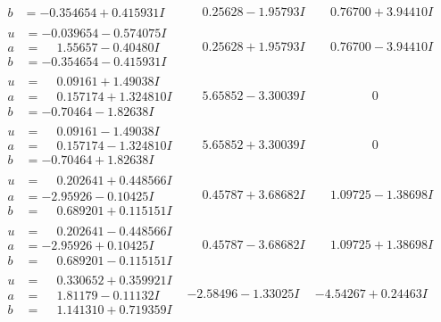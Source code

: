 \documentclass[1p]{elsarticle_modified}
\theoremstyle{definition}
\begin{document}
$$\begin{array}{c|c|c}
\begin{aligned}
b &= -0.354654 + 0.415931 I\end{aligned}
 & \phantom{-}0.25628 - 1.95793 I & \phantom{-}0.76700 + 3.94410 I \\ \hline\begin{aligned}
u &= -0.039654 - 0.574075 I \\
a &= \phantom{-}1.55657 - 0.40480 I \\
b &= -0.354654 - 0.415931 I\end{aligned}
 & \phantom{-}0.25628 + 1.95793 I & \phantom{-}0.76700 - 3.94410 I \\ \hline\begin{aligned}
u &= \phantom{-}0.09161 + 1.49038 I \\
a &= \phantom{-}0.157174 + 1.324810 I \\
b &= -0.70464 - 1.82638 I\end{aligned}
 & \phantom{-}5.65852 - 3.30039 I & \phantom{-0.000000 } 0 \\ \hline\begin{aligned}
u &= \phantom{-}0.09161 - 1.49038 I \\
a &= \phantom{-}0.157174 - 1.324810 I \\
b &= -0.70464 + 1.82638 I\end{aligned}
 & \phantom{-}5.65852 + 3.30039 I & \phantom{-0.000000 } 0 \\ \hline\begin{aligned}
u &= \phantom{-}0.202641 + 0.448566 I \\
a &= -2.95926 - 0.10425 I \\
b &= \phantom{-}0.689201 + 0.115151 I\end{aligned}
 & \phantom{-}0.45787 + 3.68682 I & \phantom{-}1.09725 - 1.38698 I \\ \hline\begin{aligned}
u &= \phantom{-}0.202641 - 0.448566 I \\
a &= -2.95926 + 0.10425 I \\
b &= \phantom{-}0.689201 - 0.115151 I\end{aligned}
 & \phantom{-}0.45787 - 3.68682 I & \phantom{-}1.09725 + 1.38698 I \\ \hline\begin{aligned}
u &= \phantom{-}0.330652 + 0.359921 I \\
a &= \phantom{-}1.81179 - 0.11132 I \\
b &= \phantom{-}1.141310 + 0.719359 I\end{aligned}
 & -2.58496 - 1.33025 I & -4.54267 + 0.24463 I\\

\end{array}$$
\end{document}
